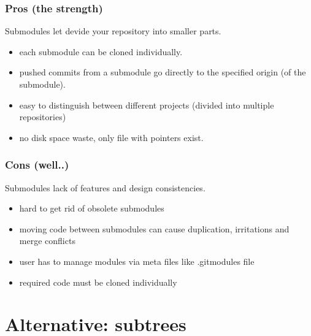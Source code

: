 \documentclass[10pt]{beamer}
\begin{document}
\begin{frame}
  \frametitle{Pros (the strength)}
  	Submodules let devide your repository into smaller parts.
	\begin{itemize}
		\item each submodule can be cloned individually.
		\item pushed commits from a submodule go directly to the specified origin (of the submodule).
		\item easy to distinguish between different projects (divided into multiple repositories)
		\item no disk space waste, only file with pointers exist.
	\end{itemize}
\end{frame}

\begin{frame}
	\frametitle{Cons (well..)}
	Submodules lack of features and design consistencies.
	\begin{itemize}
		\item hard to get rid of obsolete submodules
		\item moving code between submodules can cause duplication, irritations and merge conflicts
		\item user has to manage modules via meta files like .gitmodules file
		\item required code must be cloned individually
	\end{itemize}
\end{frame}

\section{Alternative: subtrees}
\end{document}
